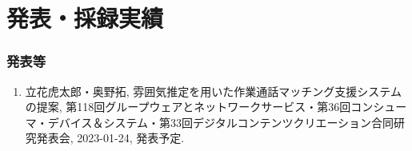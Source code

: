 \chapter*{発表・採録実績}


\subsection*{発表等}
\begin{enumerate}
\renewcommand{\labelenumi}{[\arabic{enumi}]}
    \item 立花虎太郎・奥野拓, 雰囲気推定を用いた作業通話マッチング支援システムの提案, 第118回グループウェアとネットワークサービス・第36回コンシューマ・デバイス＆システム・第33回デジタルコンテンツクリエーション合同研究発表会, 2023-01-24, 発表予定.
\end{enumerate}
